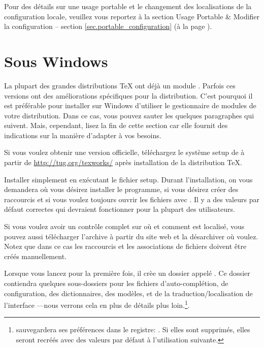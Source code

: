 Pour des détails sur une usage portable et le changement des localisations de la configuration locale, veuillez vous reportez à la section Usage Portable \& Modifier la configuration -- section \ref{sec.portable_configuration} (à la page \pageref{sec.portable_configuration}).

\section{Sous Windows}

La plupart des grandes distributions \TeX{} ont déjà un module \Tw. Parfois ces versions ont des améliorations spécifiques pour la distribution. C'est pourquoi il est préférable pour installer \Tw{} sur Windows d'utiliser le gestionnaire de modules de votre distribution. Dans ce cas, vous pouvez sauter les quelques paragraphes qui suivent. Mais, cependant, lisez la fin de cette section car elle fournit des indications sur la manière d'adapter \Tw{} à vos besoins.

Si vous voulez obtenir une version \og officielle\fg, téléchargez le système setup de \Tw{} à partir de  \url{http://tug.org/texworks/}  après installation de la distribution \TeX.

Installer simplement \Tw{} en exécutant le fichier setup. Durant l'installation, on vous demandera où vous désirez installer le programme, si vous désirez créer des raccourcis et si vous voulez toujours ouvrir les fichiers  avec \Tw. Il y a des valeurs par défaut correctes qui devraient fonctionner pour la plupart des utilisateurs.

Si vous voulez avoir un contrôle complet sur où et comment \Tw{} est localisé, vous pouvez aussi télécharger l'archive  à partir du site web et la désarchiver où voulez. Notez que dans ce cas les raccourcis et les associations de fichiers doivent être créés manuellement.

\urldef{\TwRegistryPath}

Lorsque vous lancez {\Tw} pour la première fois, il crèe un dossier appelé . Ce dossier contiendra quelques sous-dossiers pour les fichiers d'auto-complétion, de configuration, des dictionnaires, des modèles, et de la traduction/localisation de l'interface ---nous verrons cela en plus de détails plus loin.\footnote{{\Tw} sauvegardera ses préférences dans le registre:
\TwRegistryPath. Si elles sont supprimés, elles seront recréés avec des valeurs par défaut à l'utilisation suivante.}.

